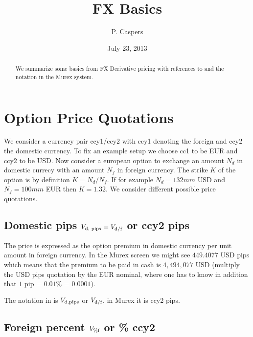 \documentclass{amsart}
\theoremstyle{plain}
\numberwithin{equation}{section}
\begin{document}

\title[FX Basics]{FX Basics}
\author{P. Caspers}
\date{July 23, 2013}
\begin{abstract}
We summarize some basics from FX Derivative pricing with references to \cite{Clark} and the notation
in the Murex system.
\end{abstract}

\maketitle

\section{Option Price Quotations}

We consider a currency pair ccy1/ccy2 with ccy1 denoting the foreign and ccy2 the domestic currency. To fix an example
setup we choose cc1 to be EUR and ccy2 to be USD. Now consider a european option to exchange an amount $N_d$ in domestic
currecy with an amount $N_f$ in foreign currency. The strike $K$ of the option is by definition $K=N_d / N_f$. If for
example $N_d = 132mm$ USD and $N_f = 100mm$ EUR then $K = 1.32$. We consider different possible price quotations.

\subsection{Domestic pips $V_{\textnormal{d, pips}} = V_{\textnormal{d/f}}$ or ccy2 pips}

The price is expressed as the option premium in domestic currency per unit amount in foreign currency. In the Murex screen
we might see $449.4077$ USD pips which means that the premium to be paid in cash is $4,494,077$ USD (multiply the USD pips
quotation by the EUR nominal, where one has to know in addition that $1$ pip = $0.01\%$ = $0.0001$).

The notation in \cite{Clark} is $V_{\textnormal{d,pips}}$ or $V_{\textnormal{d/f}}$, in Murex it is ccy2 pips.

\subsection{Foreign percent $V_{\%\textnormal{f}}$ or \% ccy2}
\end{document}
